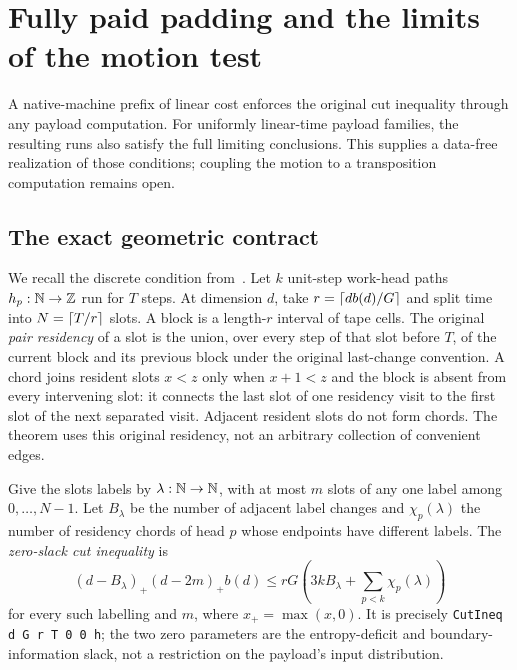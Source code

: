 \section{Fully paid padding and the limits of the motion test}\label{sec:padding}

A native-machine prefix of linear cost enforces the original cut inequality
through any payload computation. For uniformly linear-time payload families,
the resulting runs also satisfy the full limiting conclusions. This supplies
a data-free realization of those conditions; coupling the motion to a
transposition computation remains open.

\subsection{The exact geometric contract}

We recall the discrete condition from~\cite{FirstPaper2026}. Let $k$ unit-step
work-head paths $h_p:\mathbb N\to\mathbb Z$ run for $T$ steps. At dimension $d$, take
$r=\lceil db(d)/G\rceil$ and split time into $N=\lceil T/r\rceil$ slots. A block is a
length-$r$ interval of tape cells. The original \emph{pair residency} of a slot
is the union, over every step of that slot before $T$, of the current block
and its previous block under the original last-change convention. A chord
joins resident slots $x<z$ only when $x+1<z$ and the block is absent from
every intervening slot: it connects the last slot of one residency visit to
the first slot of the next separated visit. Adjacent resident slots do not
form chords. The theorem uses this original residency, not an arbitrary
collection of convenient edges.

Give the slots labels by $\lambda:\mathbb N\to\mathbb N$, with at most $m$ slots of any
one label among $0,\ldots,N-1$. Let $B_\lambda$ be the number of adjacent label changes and
$\chi_p(\lambda)$ the number of residency chords of head $p$ whose endpoints
have different labels. The \emph{zero-slack cut inequality} is
\begin{equation}\label{eq:zero-cut}
 (d-B_\lambda)_+
 (d-2m)_+b(d)
 \le rG\left(3kB_\lambda+\sum_{p<k}\chi_p(\lambda)\right)
\end{equation}
for every such labelling and $m$, where $x_+=\max(x,0)$.
It is precisely \texttt{CutIneq d G r T 0 0 h}; the two zero parameters are
the entropy-deficit and boundary-information slack, not a restriction on the
payload's input distribution.

